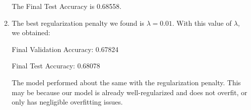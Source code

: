 \documentclass{article}
\begin{document}
\begin{enumerate}[label=(\alph*)]
    The Final Test Accuracy is 0.68558.

    \item The best regularization penalty we found is $\lambda = 0.01$. With this value of $\lambda$, we obtained:
    
    Final Validation Accuracy: 0.67824

    Final Test Accuracy: 0.68078

    The model performed about the same with the regularization penalty. This may be because our model is already well-regularized and does not overfit, or only has negligible overfitting issues.
\end{enumerate}
\end{document}
